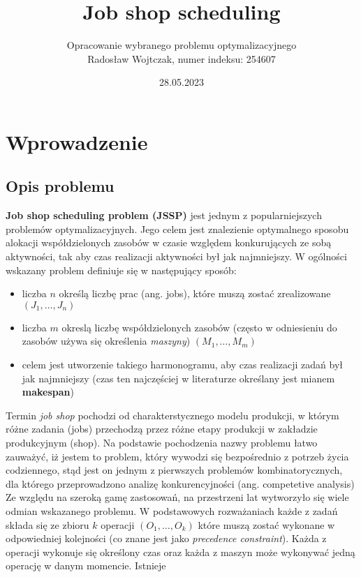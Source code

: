 \documentclass[12pt, a4paper]{report}
\title{ Job shop scheduling}
\author{Opracowanie wybranego problemu optymalizacyjnego \\
Radosław Wojtczak, numer indeksu: 254607}
\date{28.05.2023}
\begin{document}
\maketitle
\tableofcontents

\chapter{Wprowadzenie}
  \section{Opis problemu}
  
  \textbf{Job shop scheduling problem (JSSP)}  jest jednym z popularniejszych problemów optymalizacyjnych. 
  Jego celem jest znalezienie optymalnego sposobu alokacji współdzielonych zasobów w czasie względem 
  konkurujących ze sobą aktywności, tak aby czas realizacji aktywności był jak najmniejszy.
  W ogólności wskazany problem definiuje się w następujący sposób:
  \begin{itemize}
    \item liczba $n$ określą liczbę prac (ang. jobs), które muszą zostać zrealizowane
    $(J_{1}, \dots, J_{n})$
    \item liczba $m$ okreslą liczbę współdzielonych zasobów (często w odniesieniu 
    do zasobów używa się określenia \textit{maszyny}) $(M_{1}, \dots, M_{m})$
    \item celem jest utworzenie takiego harmonogramu, aby czas realizacji zadań
    był jak najmniejszy (czas ten najczęściej w literaturze określany jest mianem \textbf{makespan})
  \end{itemize}
  Termin \textit{job shop} pochodzi od charakterstycznego modelu produkcji, w którym różne zadania (jobs) przechodzą 
  przez różne etapy produkcji w zakładzie produkcyjnym (shop). Na podstawie pochodzenia nazwy problemu łatwo zauważyć,
  iż jestem to problem, który wywodzi się bezpośrednio z potrzeb życia codziennego, stąd jest on jednym z pierwszych 
  problemów kombinatorycznych, dla którego przeprowadzono analizę konkurencyjności (ang. competetive analysis) \cite{Graham_competetive} \\
  Ze względu na szeroką gamę zastosowań, na przestrzeni lat wytworzyło się wiele odmian wskazanego problemu.
  W podstawowych rozważaniach każde z zadań składa się ze zbioru $k$ operacji $(O_{1}, \dots, O_{k})$ które muszą zostać wykonane 
  w odpowiedniej kolejności (co znane jest jako \textit{precedence constraint}). Każda z operacji 
  wykonuje się określony czas oraz każda z maszyn może wykonywać jedną operację w danym momencie. Istnieje
\end{document}
